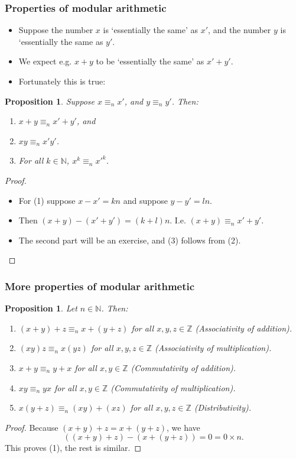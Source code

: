 \documentclass[handout]{beamer}
\newcommand{\bN}{\mathbb{N}}
\newcommand{\bZ}{\mathbb{Z}}
\newtheorem{proposition}[theorem]{Proposition}{\bfseries}{\itshape}
\begin{document}
\begin{frame}
\frametitle{Properties of modular arithmetic}
\begin{itemize}
\item Suppose the number $x$ is `essentially the same' as $x'$, and the number $y$ is `essentially the same as $y'$. 
\item We expect e.g. $x+y$ to be `essentially the same' as $x'+y'$.
\item Fortunately this is true:\vspace{0.2cm}
\end{itemize}
\begin{proposition}\label{P:subs}
Suppose $x\equiv_n x'$, and $y\equiv_n y'$. Then:
\begin{enumerate}
\item $x + y \equiv_n x' + y'$, and
\item $xy \equiv_n x'y'$.
\item For all $k\in \bN$, \/ $x^k\equiv_n x'^k$.
\end{enumerate}
\end{proposition}
\begin{proof}
\begin{itemize}
\item For (1) suppose $x-x' = kn$ and suppose $y-y' =ln$. 
\item Then $(x+y)-(x'+y')=(k+l)n$. I.e. $(x+y)\equiv_n x'+y'$. 
\item The second part will be an exercise, and (3) follows from (2).
\end{itemize}
\end{proof}
\end{frame}

\begin{frame}
\frametitle{More properties of modular arithmetic}
\begin{proposition}\label{P:arith}
Let $n\in \bN$. Then:
\begin{enumerate}[(1)]
\item $(x + y) + z \equiv_n x + (y + z)$ for all $x,y,z\in\bZ$ (Associativity of addition).
\item $(xy)z \equiv_n x(yz)$ for all $x,y,z\in\bZ$ (Associativity of multiplication).
\item $x + y \equiv_n y + x$ for all $x,y\in\bZ$ (Commutativity of addition).
\item $xy \equiv_n yx$ for all $x,y\in\bZ$ (Commutativity of multiplication).
\item $x(y + z) \equiv_n (xy) + (xz)$ for all $x,y,z\in\bZ$ (Distributivity).
\end{enumerate}
\end{proposition}
\begin{proof}\mbox{}
Because $(x+y)+z = x+(y+z)$, we have 
\[((x+y)+z) - (x+(y+z))=0=0\times n.\]
This proves (1), the rest is similar. 
\end{proof}
\end{frame}
\end{document}
